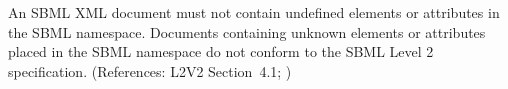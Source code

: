 An SBML XML document must not contain undefined elements or
attributes in the SBML namespace.  Documents containing unknown
elements or attributes placed in the SBML namespace do not conform
to the SBML Level 2 specification.  (References: L2V2 Section~4.1;
)
